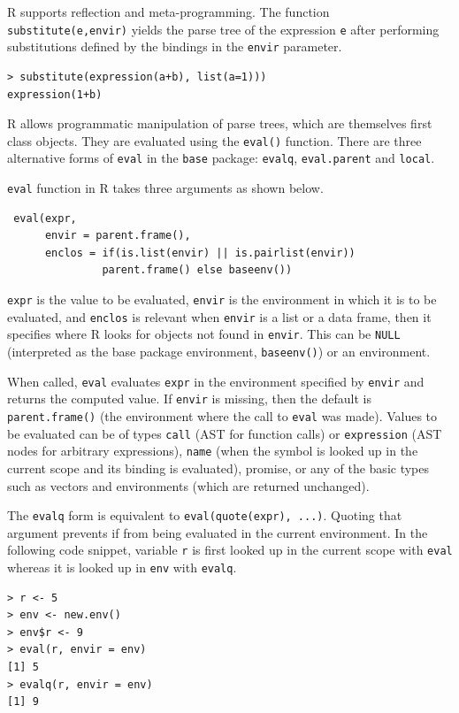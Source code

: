 \documentclass[USenglish,cleveref, autoref, thm-restate]{lipics-v2019}
\newcommand{\eval}{\texttt{eval}\xspace}
\renewcommand{\c}[1]{\lstinline{#1}\xspace}
\begin{document}
R supports reflection and meta-programming. The function \c{substitute(e,envir)}
yields the parse tree of the expression \c{e} after performing substitutions
defined by the bindings in the \c{envir} parameter.

\begin{lstlisting}
> substitute(expression(a+b), list(a=1)))  
expression(1+b)
\end{lstlisting}

\noindent
R allows programmatic manipulation of parse trees, which are themselves
first class objects. They are evaluated using the \c{eval()}
function. There are three alternative forms  of \eval in the \c{base} package:
\c{evalq}, \c{eval.parent} and \c{local}.

\eval function in R takes three arguments as shown below.
\begin{lstlisting}
 eval(expr,
      envir = parent.frame(),
      enclos = if(is.list(envir) || is.pairlist(envir))
               parent.frame() else baseenv())
\end{lstlisting}           

\c{expr} is the value to be evaluated, \c{envir}
is the environment in which it is to be evaluated, and \c{enclos} is
relevant when \c{envir} is a list or a data frame, then it specifies where R
looks for objects not found in \c{envir}. This can be \c{NULL} (interpreted
as the base package environment, \c{baseenv()}) or an environment.

When called, \eval evaluates \c{expr} in the environment specified by
\c{envir} and returns the computed value. If \c{envir} is missing, then the
default is \c{parent.frame()} (the environment where the call to \eval was
made).  Values to be evaluated can be of types \c{call} (AST for function
calls) or \c{expression} (AST nodes for arbitrary expressions), \c{name}
(when the symbol is looked up in the current scope and its binding is
evaluated), promise, or any of the basic types such as vectors and
environments (which are returned unchanged).

The \c{evalq} form is equivalent to \c{eval(quote(expr), ...)}.  Quoting
that argument prevents if from being evaluated in the current environment.
In the following code snippet, variable \c{r} is first looked up in
the current scope with \eval whereas it is looked up in \c{env} with
\c{evalq}.

\begin{lstlisting}
> r <- 5
> env <- new.env()
> env$r <- 9
> eval(r, envir = env)
[1] 5
> evalq(r, envir = env)
[1] 9
\end{lstlisting}
\end{document}
